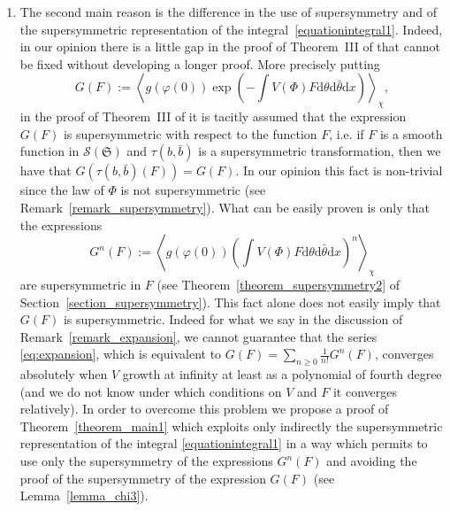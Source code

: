 \documentclass[a4paper,10pt]{article}
\newcommand{\assign}{:=}
\newcommand{\mathd}{\mathrm{d}}
\newenvironment{enumeratenumeric}{\begin{enumerate}[1.] }{\end{enumerate}}
\begin{document}
\begin{enumeratenumeric}
  \item The second main reason is the difference in the use of supersymmetry
  and of the supersymmetric representation of the
  integral~{\eqref{equationintegral1}}. Indeed, in our opinion there is a
  little gap in the proof of Theorem~III of {\cite{Klein1984}} that cannot be
  fixed without developing a longer proof. More precisely putting
  \[ G (F) \assign \left\langle g (\varphi (0)) \exp \left( - \int V (\Phi) F
     \mathd \theta \mathd \bar{\theta} \mathd x \right) \right\rangle_{\chi},
  \]
  in the proof of Theorem~III of {\cite{Klein1984}} it is tacitly assumed that
  the expression $G (F)$ is supersymmetric with respect to the function $F$,
  i.e. if $F$ is a smooth function in $\mathcal{S} (\mathfrak{S})$ and $\tau
  (b, \bar{b})$ is a supersymmetric transformation, then we have that $G (\tau
  (b, \bar{b}) (F)) = G (F)$. In our opinion this fact is non-trivial since
  the law of $\Phi$ is not supersymmetric (see
  Remark~\ref{remark_supersymmetry}). What can be easily proven is only that
  the expressions
  \[ G^n (F) \assign \left\langle g (\varphi (0)) \left( \int V (\Phi) F
     \mathd \theta \mathd \bar{\theta} \mathd x \right)^n \right\rangle_{\chi}
  \]
  are supersymmetric in $F$ (see Theorem~\ref{theorem_supersymmetry2} of
  Section~\ref{section_supersymmetry}). This fact alone does not easily imply
  that $G (F)$ is supersymmetric. Indeed for what we say in the discussion of
  Remark~\ref{remark_expansion}, we cannot guarantee that the series
  {\eqref{eq:expansion}}, which is equivalent to $G (F) = \sum_{n \geqslant 0}
  \frac{1}{n!} G^n (F)$, converges absolutely when $V$ growth at infinity at
  least as a polynomial of fourth degree (and we do not know under which
  conditions on $V$ and $F$ it converges relatively). In order to overcome
  this problem we propose a proof of Theorem~\ref{theorem_main1} which
  exploits only indirectly the supersymmetric representation of the integral
  {\eqref{equationintegral1}} in a way which permits to use only the
  supersymmetry of the expressions $G^n (F)$ and avoiding the proof of the
  supersymmetry of the expression $G (F)$ (see Lemma~\ref{lemma_chi3}).
\end{enumeratenumeric}
\end{document}
